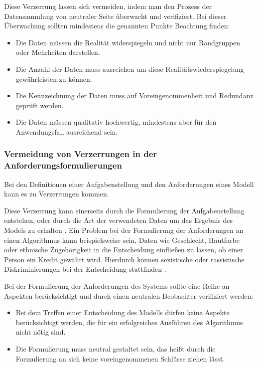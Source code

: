 \documentclass[12pt]{article}
\begin{document}
Diese Verzerrung lassen sich vermeiden, indem man den Prozess der Datensammlung von neutraler Seite überwacht und verifiziert.
Bei dieser Überwachung sollten mindestens die genannten Punkte Beachtung finden: 
\begin{itemize}
    \item Die Daten müssen die Realität widerspiegeln und nicht nur Randgruppen oder Mehrheiten darstellen.
    \item Die Anzahl der Daten muss ausreichen um diese Realitätswiederspiegelung gewährleisten zu können.
    \item Die Kennzeichnung der Daten muss auf Voreingenommenheit und Redundanz geprüft werden.
    \item Die Daten müssen qualitativ hochwertig, mindestens aber für den Anwendungsfall ausreichend sein.
\end{itemize}

\subsubsection{Vermeidung von Verzerrungen in der Anforderungsformulierungen}
Bei den Definitionen einer Aufgabenstellung und den Anforderungen eines Modell kann es zu Verzerrungen kommen.

Diese Verzerrung kann einerseits durch die Formulierung der Aufgabenstellung entstehen, oder durch die Art der verwendeten Daten um das Ergebnis des Models zu erhalten \cite{Srinivasan}.
Ein Problem bei der Formulierung der Anforderungen an einen Algorithmus kann beispielsweise sein, Daten wie Geschlecht, Hautfarbe oder ethnische Zugehörigkeit in die 
Entscheidung einfließen zu lassen, ob einer Person ein Kredit gewährt wird. Hierdurch können sexistische oder rassistische Diskriminierungen bei der Entscheidung stattfinden \cite{Srinivasan}.

Bei der Formulierung der Anforderungen des Systems sollte eine Reihe an Aspekten berücksichtigt und durch einen neutralen Beobachter verifiziert werden:
\begin{itemize}
    \item Bei dem Treffen einer Entscheidung des Modells dürfen keine Aspekte berücksichtigt werden, die für ein erfolgreiches Ausführen des Algorithmus nicht nötig sind.
    \item Die Formulierung muss neutral gestaltet sein, das heißt durch die Formulierung an sich keine voreingenommenen Schlüsse ziehen lässt.
\end{itemize}
\end{document}
